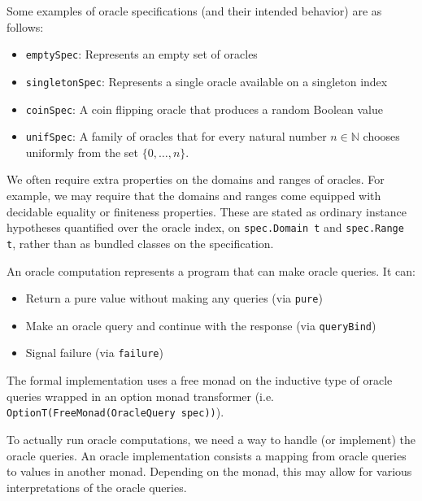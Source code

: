 Some examples of oracle specifications (and their intended behavior) are as follows:
\begin{itemize}
    \item \verb|emptySpec|: Represents an empty set of oracles
    \item \verb|singletonSpec|: Represents a single oracle available on a singleton index
    \item \verb|coinSpec|: A coin flipping oracle that produces a random Boolean value
    \item \verb|unifSpec|: A family of oracles that for every natural number $n \in \mathbb{N}$ chooses uniformly from the set $\{0, \ldots, n\}$.
\end{itemize}

We often require extra properties on the domains and ranges of oracles. For example, we may require that the domains and ranges come equipped with decidable equality or finiteness properties.
These are stated as ordinary instance hypotheses quantified over the oracle index, on \verb|spec.Domain t| and \verb|spec.Range t|, rather than as bundled classes on the specification.

\begin{definition}
    \label{def:oracle_computation}
    An oracle computation represents a program that can make oracle queries. It can:
    \begin{itemize}
        \item Return a pure value without making any queries (via \texttt{pure})
        \item Make an oracle query and continue with the response (via \texttt{queryBind})
        \item Signal failure (via \texttt{failure})
    \end{itemize}
    The formal implementation uses a free monad on the inductive type of oracle queries  wrapped in an option monad transformer (i.e. \verb|OptionT(FreeMonad(OracleQuery spec))|).
\end{definition}

\begin{definition}
    \label{def:handling_oracle_queries}
    To actually run oracle computations, we need a way to handle (or implement) the oracle queries.
    An oracle implementation consists a mapping from oracle queries to values in another monad. Depending on the monad, this may allow for various interpretations of the oracle queries.
\end{definition}

